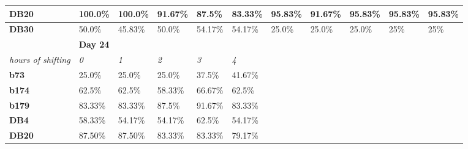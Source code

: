 \documentclass[a4paper]{article}
\begin{document}
\begin{table}[H]
{\begin{tabular}{|l|l|l|l|l|l|lllll}
\textbf{DB20} & \cellcolor[HTML]{BBDAFF}100.0\% & \cellcolor[HTML]{FFFE65}100.0\% & \cellcolor[HTML]{FD6864}91.67\% & \cellcolor[HTML]{FD6864}87.5\% & \cellcolor[HTML]{FD6864}83.33\% & \multicolumn{1}{l|}{\cellcolor[HTML]{BBDAFF}95.83\%} & \multicolumn{1}{l|}{\cellcolor[HTML]{FD6864}91.67\%} & \multicolumn{1}{l|}{\cellcolor[HTML]{FFFE65}95.83\%} & \multicolumn{1}{l|}{\cellcolor[HTML]{FFFE65}95.83\%} & \multicolumn{1}{l|}{\cellcolor[HTML]{FFFE65}95.83\%} \\ \hline
\textbf{DB30} & \cellcolor[HTML]{BBDAFF}50.0\% & \cellcolor[HTML]{FD6864}45.83\% & \cellcolor[HTML]{FFFE65}50.0\% & \cellcolor[HTML]{67FD9A}54.17\% & \cellcolor[HTML]{67FD9A}54.17\% & \multicolumn{1}{l|}{\cellcolor[HTML]{BBDAFF}25.0\%} & \multicolumn{1}{l|}{\cellcolor[HTML]{FFFE65}25.0\%} & \multicolumn{1}{l|}{\cellcolor[HTML]{FFFE65}25.0\%} & \multicolumn{1}{l|}{\cellcolor[HTML]{FFFE65}25\%} & \multicolumn{1}{l|}{\cellcolor[HTML]{FFFE65}25\%} \\ \hline
 & \multicolumn{5}{l|}{\textbf{Day 24}} & \multicolumn{5}{l}{\cellcolor[HTML]{FFFFFF}} \\ \cline{1-6}
\textit{hours of shifting} & \textit{0} & \textit{1} & \textit{2} & \textit{3} & \textit{4} & \multicolumn{5}{l}{\cellcolor[HTML]{FFFFFF}} \\ \cline{1-6}
\textbf{b73} & \cellcolor[HTML]{BBDAFF}25.0\% & \cellcolor[HTML]{FFFE65}25.0\% & \cellcolor[HTML]{FFFE65}25.0\% & \cellcolor[HTML]{67FD9A}37.5\% & \cellcolor[HTML]{67FD9A}41.67\% & \multicolumn{5}{l}{\cellcolor[HTML]{FFFFFF}} \\ \cline{1-6}
\textbf{b174} & \cellcolor[HTML]{BBDAFF}62.5\% & \cellcolor[HTML]{FFFE65}62.5\% & \cellcolor[HTML]{FD6864}58.33\% & \cellcolor[HTML]{67FD9A}66.67\% & \cellcolor[HTML]{FFFE65}62.5\% & \multicolumn{5}{l}{\cellcolor[HTML]{FFFFFF}} \\ \cline{1-6}
\textbf{b179} & \cellcolor[HTML]{BBDAFF}83.33\% & \cellcolor[HTML]{FFFE65}83.33\% & \cellcolor[HTML]{67FD9A}87.5\% & \cellcolor[HTML]{67FD9A}91.67\% & \cellcolor[HTML]{FFFE65}83.33\% & \multicolumn{5}{l}{\cellcolor[HTML]{FFFFFF}} \\ \cline{1-6}
\textbf{DB4} & \cellcolor[HTML]{BBDAFF}58.33\% & \cellcolor[HTML]{FFFE65}54.17\% & \cellcolor[HTML]{FD6864}54.17\% & \cellcolor[HTML]{67FD9A}62.5\% & \cellcolor[HTML]{FD6864}54.17\% & \multicolumn{5}{l}{\cellcolor[HTML]{FFFFFF}} \\ \cline{1-6}
\textbf{DB20} & \cellcolor[HTML]{BBDAFF}87.50\% & \cellcolor[HTML]{FFFE65}87.50\% & \cellcolor[HTML]{FD6864}83.33\% & \cellcolor[HTML]{FD6864}83.33\% & \cellcolor[HTML]{FD6864}79.17\% & \multicolumn{5}{l}{\cellcolor[HTML]{FFFFFF}} \\ \cline{1-6}

\end{tabular}}
\end{table}
\end{document}
